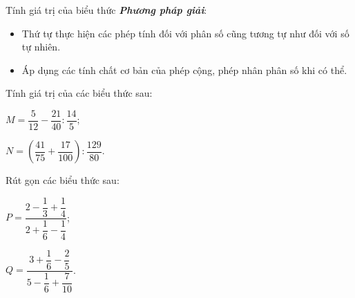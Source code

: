 \begin{dang}{Tính giá trị của biểu thức}
	\textbf{\textit{Phương pháp giải}}: \begin{itemize}
		\item Thứ tự thực hiện các phép tính đối với phân số cũng tương tự như đối với số tự nhiên.
		\item Áp dụng các tính chất cơ bản của phép cộng, phép nhân phân số khi có thể.
	\end{itemize}
\end{dang}
\setcounter{vd}{0}
\begin{vd}%
Tính giá trị của các biểu thức sau$\colon$
\begin{enumEX}{2}
	\item $ M=\dfrac{5}{12}-\dfrac{21}{40} : \dfrac{14}{5} $;
	\item  $ N=\left(\dfrac{41}{75}+\dfrac{17}{100}\right) :\dfrac{129}{80} $.
\end{enumEX}
\end{vd}
\begin{vd}%
	Rút gọn các biểu thức sau$\colon$
	\begin{enumEX}{2}
		\item $ P=\dfrac{2-\dfrac{1}{3}+\dfrac{1}{4}}{2+\dfrac{1}{6}-\dfrac{1}{4}}$;
		\item  $ Q=\dfrac{3+\dfrac{1}{6}-\dfrac{2}{5}}{5-\dfrac{1}{6}+\dfrac{7}{10}}$.
	\end{enumEX}
\end{vd}
